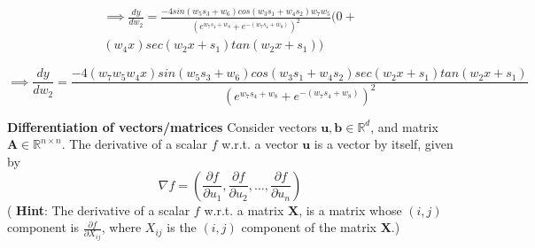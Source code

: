 \documentclass[solution,addpoints,12pt]{exam}
\begin{document}
\begin{questions}
\begin{solution}
          \begin{multline*}
          \implies \frac{dy}{dw_{2}} = \frac{-4sin(w_{5}s_{3}+w_{6})cos(w_{3}s_{1}+w_{4}s_{2})w_{7}w_{5}}{(e^{w_{7}s_{4}+w_{8}}+e^{-(w_{7}s_{4}+w_{8})})^2} (0 + \\ (w_{4}x)sec(w_{2}x+s_{1})tan(w_{2}x+s_{1})) \end{multline*}
          
          \[\implies \frac{dy}{dw_{2}} = \frac{-4(w_{7}w_{5}w_{4}x)sin(w_{5}s_{3}+w_{6})cos(w_{3}s_{1}+w_{4}s_{2})sec(w_{2}x+s_{1})tan(w_{2}x+s_{1})}{(e^{w_{7}s_{4}+w_{8}}+e^{-(w_{7}s_{4}+w_{8})})^2}\]
          
          \end{solution}
          
\question \textbf{Differentiation of vectors/matrices}
          \newline
          Consider vectors $\boldsymbol{u,b} \in \mathbb{R}^d$, and matrix $\boldsymbol{A} \in \mathbb{R}^{n \times n}$.
          \newline
          The derivative of a scalar $f$ w.r.t. a vector $\boldsymbol{u}$ is a vector by itself, given by
          \[
            \nabla f = \left( \frac{\partial f}{\partial u_1}, \frac{\partial f}{\partial u_2}, \dots, 
                         \frac{\partial f}{\partial u_n} 
                       \right)
          \]
          \newline
         ( \textbf{Hint}:  The derivative of a scalar $f$ w.r.t. a matrix $\boldsymbol{X}$, is a matrix whose $(i,j)$ component is $\frac{\partial f}{\partial X_{ij}}$, where $X_{ij}$ is the $(i,j)$ component of the matrix $\boldsymbol{X}$.)
         \newline
         \begin{parts}

\end{parts}
\end{questions}
\end{document}

